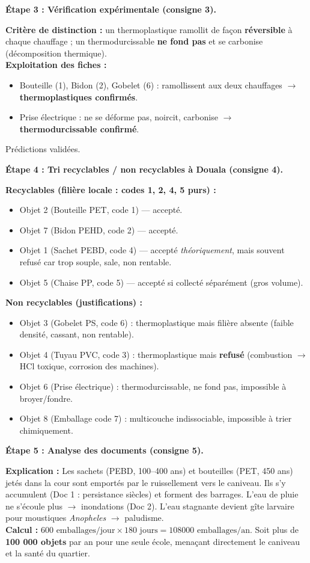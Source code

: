\documentclass[11pt]{article}
\begin{document}
\begin{exoresolu}
\textbf{Étape 3 : Vérification expérimentale (consigne 3).}\par
\textbf{Critère de distinction :} un thermoplastique ramollit de façon \textbf{réversible} à chaque chauffage ; un thermodurcissable \textbf{ne fond pas} et se carbonise (décomposition thermique).\\
\textbf{Exploitation des fiches :}
\begin{itemize}
\item Bouteille (1), Bidon (2), Gobelet (6) : ramollissent aux deux chauffages $\rightarrow$ \textbf{thermoplastiques confirmés}.
\item Prise électrique : ne se déforme pas, noircit, carbonise $\rightarrow$ \textbf{thermodurcissable confirmé}.
\end{itemize}
Prédictions validées.

\textbf{Étape 4 : Tri recyclables / non recyclables à Douala (consigne 4).}\par
\textbf{Recyclables (filière locale : codes 1, 2, 4, 5 purs) :}
\begin{itemize}
\item Objet 2 (Bouteille PET, code 1) — accepté.
\item Objet 7 (Bidon PEHD, code 2) — accepté.
\item Objet 1 (Sachet PEBD, code 4) — accepté \emph{théoriquement}, mais souvent refusé car trop souple, sale, non rentable.
\item Objet 5 (Chaise PP, code 5) — accepté si collecté séparément (gros volume).
\end{itemize}
\textbf{Non recyclables (justifications) :}
\begin{itemize}
\item Objet 3 (Gobelet PS, code 6) : thermoplastique mais filière absente (faible densité, cassant, non rentable).
\item Objet 4 (Tuyau PVC, code 3) : thermoplastique mais \textbf{refusé} (combustion $\rightarrow$ HCl toxique, corrosion des machines).
\item Objet 6 (Prise électrique) : thermodurcissable, ne fond pas, impossible à broyer/fondre.
\item Objet 8 (Emballage code 7) : multicouche indissociable, impossible à trier chimiquement.
\end{itemize}

\textbf{Étape 5 : Analyse des documents (consigne 5).}\par
\textbf{Explication :} Les sachets (PEBD, \num{100}--\num{400} ans) et bouteilles (PET, \num{450} ans) jetés dans la cour sont emportés par le ruissellement vers le caniveau. Ils s'y accumulent (Doc 1 : persistance siècles) et forment des barrages. L'eau de pluie ne s'écoule plus $\rightarrow$ inondations (Doc 2). L'eau stagnante devient gîte larvaire pour moustiques \emph{Anopheles} $\rightarrow$ paludisme.\\
\textbf{Calcul :} $\num{600} \text{ emballages/jour} \times \num{180} \text{ jours} = \num{108000} \text{ emballages/an}$.
Soit plus de \textbf{100 000 objets} par an pour une seule école, menaçant directement le caniveau et la santé du quartier.


\end{exoresolu}
\end{document}
